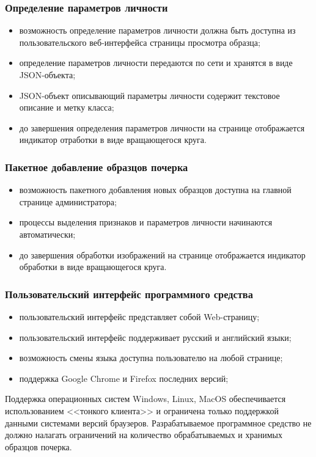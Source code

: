 \subsubsection{Определение параметров личности}
\label{sec:freq:psiho_analysis}
\begin{itemize}
	\item возможность определение параметров личности должна быть доступна из пользовательского веб-интерфейса страницы просмотра образца;
	\item определение параметров личности передаются по сети и хранятся в виде JSON-объекта;
	\item JSON-объект описывающий параметры личности содержит текстовое описание и метку класса;
	\item до завершения определения параметров личности на странице отображается индикатор отработки в виде вращающегося круга.
\end{itemize}

\subsubsection{Пакетное добавление образцов почерка}
\label{sec:freq:package_add}
\begin{itemize}
	\item возможность пакетного добавления новых образцов доступна на главной странице администратора;
	\item процессы выделения признаков и параметров личности начинаются автоматически;
	\item до завершения обработки изображений на странице отображается индикатор обработки в виде вращающегося круга.
\end{itemize}

\subsubsection{Пользовательский интерфейс программного средства}
\begin{itemize}
	\item пользовательский интерфейс представляет собой Web-страницу;
	\item пользовательский интерфейс поддерживает русский и английский языки;
	\item возможность смены языка доступна пользователю на любой странице;
	\item поддержка Google Chrome и Firefox последних версий;
\end{itemize}

Поддержка операционных систем Windows, Linux, MacOS обеспечивается использованием <<тонкого клиента>> и ограничена только поддержкой данными системами версий браузеров.
Разрабатываемое программное средство не должно налагать ограничений на количество обрабатываемых и хранимых образцов почерка.